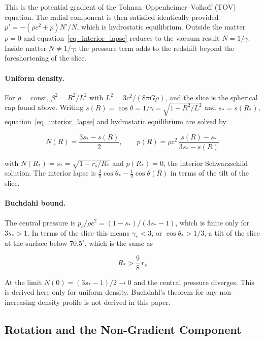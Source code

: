 \documentclass[pdflatex,sn-mathphys-num]{sn-jnl}%
\theoremstyle{thmstyleone}%
\theoremstyle{thmstyletwo}%
\theoremstyle{thmstylethree}%
\begin{document}
This is the potential gradient of the Tolman--Oppenheimer--Volkoff (TOV) equation. The radial component is then satisfied identically provided $p'=-\left(\rho c^2+p\right)N'/N$, which is hydrostatic equilibrium. Outside the matter $p=0$ and equation~\eqref{eq_interior_lapse} reduces to the vacuum result $N=1/\gamma$. Inside matter $N\neq1/\gamma$: the pressure term adds to the redshift beyond the foreshortening of the slice.

\paragraph{Uniform density.} For $\rho=\text{const}$, $\beta^2=R^2/L^2$ with $L^2=3c^2/(8\pi G\rho)$, and the slice is the spherical cap found above. Writing $s(R)=\cos\theta=1/\gamma=\sqrt{1-R^2/L^2}$ and $s_*=s(R_*)$, equation~\eqref{eq_interior_lapse} and hydrostatic equilibrium are solved by

\begin{equation}\label{eq_uniform_interior}
    N(R)=\frac{3s_*-s(R)}{2},
    \qquad
    p(R)=\rho c^{2}\,\frac{s(R)-s_*}{3s_*-s(R)}
\end{equation}

with $N(R_*)=s_*=\sqrt{1-r_s/R_*}$ and $p(R_*)=0$, the interior Schwarzschild solution. The interior lapse is $\tfrac32\cos\theta_*-\tfrac12\cos\theta(R)$ in terms of the tilt of the slice.

\paragraph{Buchdahl bound.} The central pressure is $p_c/\rho c^2=(1-s_*)/(3s_*-1)$, which is finite only for $3s_*>1$. In terms of the slice this means $\gamma_*<3$, or $\cos\theta_*>1/3$, a tilt of the slice at the surface below $70.5^\circ$, which is the same as

\begin{equation}
    R_*>\frac{9}{8}\,r_s
\end{equation}

At the limit $N(0)=(3s_*-1)/2\to0$ and the central pressure diverges. This is derived here only for uniform density. Buchdahl's theorem for any non-increasing density profile is not derived in this paper.

\subsection{Rotation and the Non-Gradient Component}\label{sec_rotation}
\end{document}
